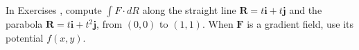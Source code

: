 {\noindent In Exercises} 
{,  compute $\int F \cdot dR$ along the straight line $\mathbf{R} = t \mathbf{i} + t \mathbf{j}$ and the parabola $\mathbf{R} = t \mathbf{i} + t^2 \mathbf{j}$, from $(0,0)$ to $(1,1)$.  When $\mathbf{F}$ is a gradient field, use its potential $f(x,y)$.
}
